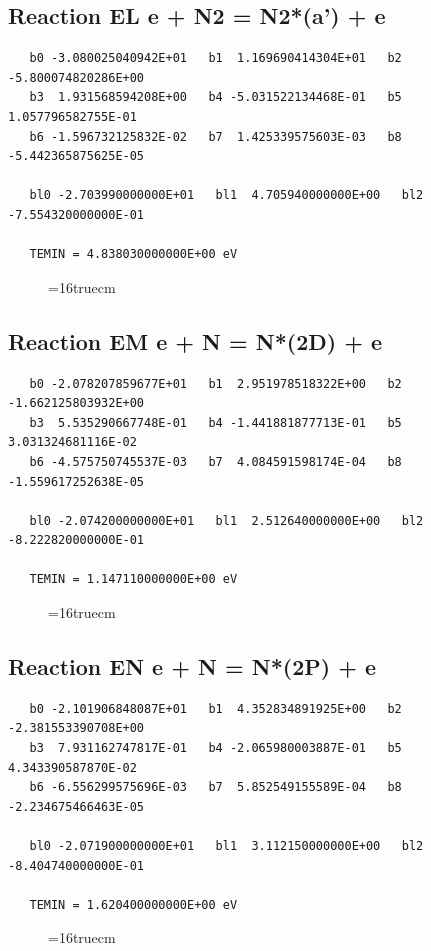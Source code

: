 \documentclass[12pt,dvipdfm]{article}
\begin{document}
\subsection{
Reaction EL e + N2 = N2*(a') + e }
\begin{small}\begin{verbatim}
   b0 -3.080025040942E+01   b1  1.169690414304E+01   b2 -5.800074820286E+00
   b3  1.931568594208E+00   b4 -5.031522134468E-01   b5  1.057796582755E-01
   b6 -1.596732125832E-02   b7  1.425339575603E-03   b8 -5.442365875625E-05

   bl0 -2.703990000000E+01   bl1  4.705940000000E+00   bl2 -7.554320000000E-01

   TEMIN = 4.838030000000E+00 eV
\end{verbatim}\end{small}
\begin{figure}[h!] \label{n2rates}
\epsfxsize=16truecm
\end{figure}
\newpage

\subsection{
Reaction EM e + N = N*(2D) + e }
\begin{small}\begin{verbatim}
   b0 -2.078207859677E+01   b1  2.951978518322E+00   b2 -1.662125803932E+00
   b3  5.535290667748E-01   b4 -1.441881877713E-01   b5  3.031324681116E-02
   b6 -4.575750745537E-03   b7  4.084591598174E-04   b8 -1.559617252638E-05

   bl0 -2.074200000000E+01   bl1  2.512640000000E+00   bl2 -8.222820000000E-01

   TEMIN = 1.147110000000E+00 eV
\end{verbatim}\end{small}
\begin{figure}[h!] \label{n2rates}
\epsfxsize=16truecm
\end{figure}
\newpage

\subsection{
Reaction EN e + N = N*(2P) + e }
\begin{small}\begin{verbatim}
   b0 -2.101906848087E+01   b1  4.352834891925E+00   b2 -2.381553390708E+00
   b3  7.931162747817E-01   b4 -2.065980003887E-01   b5  4.343390587870E-02
   b6 -6.556299575696E-03   b7  5.852549155589E-04   b8 -2.234675466463E-05

   bl0 -2.071900000000E+01   bl1  3.112150000000E+00   bl2 -8.404740000000E-01

   TEMIN = 1.620400000000E+00 eV
\end{verbatim}\end{small}
\begin{figure}[h!] \label{n2rates}
\epsfxsize=16truecm
\end{figure}
\newpage
\end{document}
